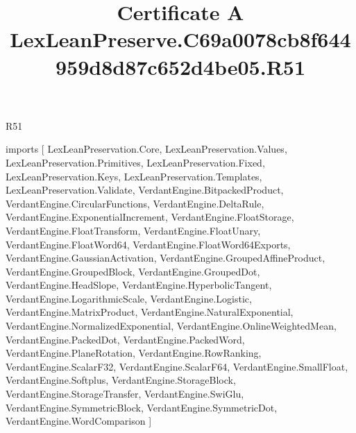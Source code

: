 \begin{lexlean}{R51}
\title{Certificate A LexLeanPreserve.C69a0078cb8f644959d8d87c652d4be05.R51}
\begin{coremodule}
imports [
  LexLeanPreservation.Core,
  LexLeanPreservation.Values,
  LexLeanPreservation.Primitives,
  LexLeanPreservation.Fixed,
  LexLeanPreservation.Keys,
  LexLeanPreservation.Templates,
  LexLeanPreservation.Validate,
  VerdantEngine.BitpackedProduct,
  VerdantEngine.CircularFunctions,
  VerdantEngine.DeltaRule,
  VerdantEngine.ExponentialIncrement,
  VerdantEngine.FloatStorage,
  VerdantEngine.FloatTransform,
  VerdantEngine.FloatUnary,
  VerdantEngine.FloatWord64,
  VerdantEngine.FloatWord64Exports,
  VerdantEngine.GaussianActivation,
  VerdantEngine.GroupedAffineProduct,
  VerdantEngine.GroupedBlock,
  VerdantEngine.GroupedDot,
  VerdantEngine.HeadSlope,
  VerdantEngine.HyperbolicTangent,
  VerdantEngine.LogarithmicScale,
  VerdantEngine.Logistic,
  VerdantEngine.MatrixProduct,
  VerdantEngine.NaturalExponential,
  VerdantEngine.NormalizedExponential,
  VerdantEngine.OnlineWeightedMean,
  VerdantEngine.PackedDot,
  VerdantEngine.PackedWord,
  VerdantEngine.PlaneRotation,
  VerdantEngine.RowRanking,
  VerdantEngine.ScalarF32,
  VerdantEngine.ScalarF64,
  VerdantEngine.SmallFloat,
  VerdantEngine.Softplus,
  VerdantEngine.StorageBlock,
  VerdantEngine.StorageTransfer,
  VerdantEngine.SwiGlu,
  VerdantEngine.SymmetricBlock,
  VerdantEngine.SymmetricDot,
  VerdantEngine.WordComparison
]


\end{coremodule}
\end{lexlean}
